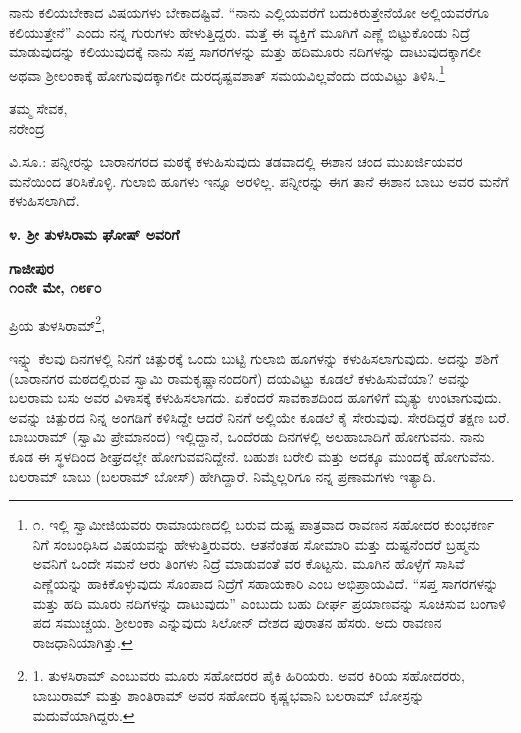 ನಾನು ಕಲಿಯಬೇಕಾದ ವಿಷಯಗಳು ಬೇಕಾದಷ್ಟಿವೆ. “ನಾನು ಎಲ್ಲಿಯವರೆಗೆ ಬದುಕಿರುತ್ತೇನೆಯೋ ಅಲ್ಲಿಯವರೆಗೂ ಕಲಿಯುತ್ತೇನೆ” ಎಂದು ನನ್ನ ಗುರುಗಳು ಹೇಳುತ್ತಿದ್ದರು. ಮತ್ತೆ ಈ ವ್ಯಕ್ತಿಗೆ ಮೂಗಿಗೆ ಎಣ್ಣೆ ಬಿಟ್ಟುಕೊಂಡು ನಿದ್ರೆ ಮಾಡುವುದನ್ನು ಕಲಿಯುವುದಕ್ಕೆ ನಾನು ಸಪ್ತ ಸಾಗರಗಳನ್ನು ಮತ್ತು ಹದಿಮೂರು ನದಿಗಳನ್ನು ದಾಟುವುದಕ್ಕಾಗಲೀ ಅಥವಾ ಶ‍್ರೀಲಂಕಾಕ್ಕೆ ಹೋಗುವುದಕ್ಕಾಗಲೀ ದುರದೃಷ್ಟವಶಾತ್ ಸಮಯವಿಲ್ಲವೆಂದು ದಯವಿಟ್ಟು ತಿಳಿಸಿ.\footnote{೧. ಇಲ್ಲಿ ಸ್ವಾಮೀಜಿಯವರು ರಾಮಾಯಣದಲ್ಲಿ ಬರುವ ದುಷ್ಟ ಪಾತ್ರವಾದ ರಾವಣನ ಸಹೋದರ ಕುಂಭಕರ್ಣ ನಿಗೆ ಸಂಬಂಧಿಸಿದ ವಿಷಯವನ್ನು ಹೇಳುತ್ತಿರುವರು. ಆತನೆಂತಹ ಸೋಮಾರಿ ಮತ್ತು ದುಷ್ಟನೆಂದರೆ ಬ್ರಹ್ಮನು ಅವನಿಗೆ ಒಂದೇ ಸಮನೆ ಆರು ತಿಂಗಳು ನಿದ್ರೆ ಮಾಡುವಂತೆ ವರ ಕೊಟ್ಟನು. ಮೂಗಿನ ಹೊಳ್ಳೆಗೆ ಸಾಸಿವೆ ಎಣ್ಣೆಯನ್ನು ಹಾಕಿಕೊಳ್ಳುವುದು ಸೊಂಪಾದ ನಿದ್ರೆಗೆ ಸಹಾಯಕಾರಿ ಎಂಬ ಅಭಿಪ್ರಾಯವಿದೆ. “ಸಪ್ತ ಸಾಗರಗಳನ್ನು ಮತ್ತು ಹದಿ ಮೂರು ನದಿಗಳನ್ನು ದಾಟುವುದು” ಎಂಬುದು ಬಹು ದೀರ್ಘ ಪ್ರಯಾಣವನ್ನು ಸೂಚಿಸುವ ಬಂಗಾಳಿ ಪದ ಸಮುಚ್ಚಯ. ಶ‍್ರೀಲಂಕಾ ಎನ್ನುವುದು ಸಿಲೋನ್ ದೇಶದ ಪುರಾತನ ಹೆಸರು. ಅದು ರಾವಣನ ರಾಜಧಾನಿಯಾಗಿತ್ತು.}

\begin{flushright}
ತಮ್ಮ ಸೇವಕ,\\ನರೇಂದ್ರ
\end{flushright}

{\small ವಿ.ಸೂ.: ಪನ್ನೀರನ್ನು ಬಾರಾನಗರದ ಮಠಕ್ಕೆ ಕಳುಹಿಸುವುದು ತಡವಾದಲ್ಲಿ ಈಶಾನ ಚಂದ ಮುಖರ್ಜಿಯವರ ಮನೆಯಿಂದ ತರಿಸಿಕೊಳ್ಳಿ. ಗುಲಾಬಿ ಹೂಗಳು ಇನ್ನೂ ಅರಳಿಲ್ಲ. ಪನ್ನೀರನ್ನು ಈಗ ತಾನೆ ಈಶಾನ ಬಾಬು ಅವರ ಮನೆಗೆ ಕಳುಹಿಸಲಾಗಿದೆ.}

\begin{center}
\textbf{೪. ಶ‍್ರೀ ತುಳಸಿರಾಮ ಘೋಷ್ ಅವರಿಗೆ}
\end{center}

\begin{flushright}
\textbf{ಗಾಜೀಪುರ\\೧೦ನೇ ಮೇ, ೧೮೯೦}
\end{flushright}

ಪ್ರಿಯ ತುಳಸಿರಾಮ್​\footnote{1. ತುಳಸಿರಾಮ್​ ಎಂಬುವರು ಮೂರು ಸಹೋದರರ ಪೈಕಿ ಹಿರಿಯರು. ಅವರ ಕಿರಿಯ ಸಹೋದರರು, ಬಾಬುರಾಮ್​ ಮತ್ತು ಶಾಂತಿರಾಮ್​ ಅವರ ಸಹೋದರಿ ಕೃಷ್ಣಭವಾನಿ ಬಲರಾಮ್​ ಬೋಸ್ರನ್ನು ಮದುವೆಯಾಗಿದ್ದರು.},

ಇನ್ನ್ನು ಕೆಲವು ದಿನಗಳಲ್ಲಿ ನಿನಗೆ ಚಿತ್ಪುರಕ್ಕೆ ಒಂದು ಬುಟ್ಟಿ ಗುಲಾಬಿ ಹೂಗಳನ್ನು ಕಳುಹಿಸಲಾಗುವುದು. ಅದನ್ನು ಶಶಿಗೆ (ಬಾರಾನಗರ ಮಠದಲ್ಲಿರುವ ಸ್ವಾಮಿ ರಾಮಕೃಷ್ಣಾನಂದರಿಗೆ) ದಯವಿಟ್ಟು ಕೂಡಲೆ ಕಳುಹಿಸುವೆಯಾ? ಅವನ್ನು ಬಲರಾಮ ಬಸು ಅವರ ವಿಳಾಸಕ್ಕೆ ಕಳುಹಿಸಲಾಗದು. ಏಕೆಂದರೆ ಸಾವಕಾಶದಿಂದ ಹೂಗಳಿಗೆ ಮೃತ್ಯು ಉಂಟಾಗುವುದು. ಅವನ್ನು ಚಿತ್ಪುರದ ನಿನ್ನ ಅಂಗಡಿಗೆ ಕಳಿಸಿದ್ದೇ ಆದರೆ ನಿನಗೆ ಅಲ್ಲಿಯೇ ಕೂಡಲೆ ಕೈ ಸೇರುವುವು. ಸೇರದಿದ್ದರೆ ತಕ್ಷಣ ಬರೆ. ಬಾಬುರಾಮ್​ (ಸ್ವಾಮಿ ಪ್ರೇಮಾನಂದ) ಇಲ್ಲಿದ್ದಾನೆ, ಒಂದೆರಡು ದಿನಗಳಲ್ಲಿ ಅಲಹಾಬಾದಿಗೆ ಹೋಗುವನು. ನಾನು ಕೂಡ ಈ ಸ್ಥಳದಿಂದ ಶೀಘ್ರದಲ್ಲೇ ಹೋಗುವವನಿದ್ದೇನೆ. ಬಹುಶಃ ಬರೇಲಿ ಮತ್ತು ಅದಕ್ಕೂ ಮುಂದಕ್ಕೆ ಹೋಗುವೆನು. ಬಲರಾಮ್​ ಬಾಬು (ಬಲರಾಮ್​ ಬೋಸ್) ಹೇಗಿದ್ದಾರೆ. ನಿಮ್ಮೆಲ್ಲರಿಗೂ ನನ್ನ ಪ್ರಣಾಮಗಳು ಇತ್ಯಾದಿ.

